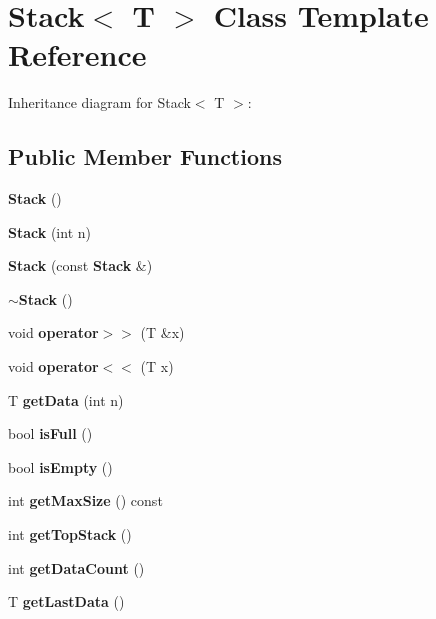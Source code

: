 \section{Stack$<$ T $>$ Class Template Reference}
\label{class_stack}
Inheritance diagram for Stack$<$ T $>$:\subsection*{Public Member Functions}
\begin{CompactItemize}
\item 
{\bf Stack} ()\label{class_stack_a06fd74f8e8f8352189f137d21d6eea3}

\item 
{\bf Stack} (int n)\label{class_stack_5f15a233e5d0cebd897179204e54d18d}

\item 
{\bf Stack} (const {\bf Stack} \&)\label{class_stack_ea0924f40cff45619db24c049e8be620}

\item 
{\bf $\sim$Stack} ()\label{class_stack_ee3bdac48d76b2afd2786f0fccaf940d}

\item 
void {\bf operator$>$$>$} (T \&x)\label{class_stack_01ecd6c181e9d1571e7432ac3a36e63e}

\item 
void {\bf operator$<$$<$} (T x)\label{class_stack_93380200f8ba3cee005d37eed9c7f688}

\item 
T {\bf get\-Data} (int n)\label{class_stack_3ab18492a5eb1f3a4c6260572e9d5452}

\item 
bool {\bf is\-Full} ()\label{class_stack_a538452081ecd8540803c5378f715e9f}

\item 
bool {\bf is\-Empty} ()\label{class_stack_2ffe4de88739498f1c07bde62e7a2403}

\item 
int {\bf get\-Max\-Size} () const \label{class_stack_6f43e7a87bbde08ac43c4234dd38ba35}

\item 
int {\bf get\-Top\-Stack} ()\label{class_stack_94366b7ee625d56e858ab0e4737b65fc}

\item 
int {\bf get\-Data\-Count} ()\label{class_stack_8907ce4d0f2c221b5c6fa94c4587cb5c}

\item 
T {\bf get\-Last\-Data} ()\label{class_stack_56eaad5e56d8d809ba7ccd52524c1d43}

\end{CompactItemize}


